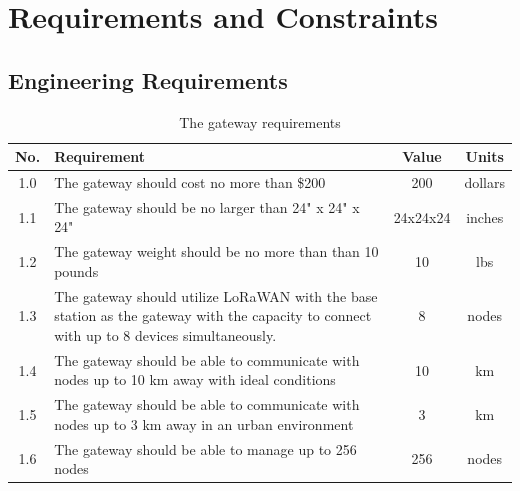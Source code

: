 \documentclass[titlepage, 11pt, letterpaper]{article}
\begin{document}
\section{Requirements and Constraints}
\subsection{Engineering Requirements}

\begin{table}[H]
\centering
\caption{The gateway requirements}
\begin{tabularx}{\linewidth}{|c|X|c|c|}
\hline
No. & Requirement & Value & Units \\
\hline\hline
1.0 & The gateway should cost no more than \$200 & 200 & dollars \\\hline
1.1 & The gateway should be no larger than 24" x 24" x 24" & 24x24x24 & inches \\\hline
1.2 & The gateway weight should be no more than than 10 pounds & 10 & lbs \\\hline
1.3 & The gateway should utilize LoRaWAN with the base station as the gateway with the capacity to connect with up to 8 devices simultaneously. & 8 & nodes \\\hline
1.4 & The gateway should be able to communicate with nodes up to 10 km away with ideal conditions & 10	& km \\\hline
1.5 & The gateway should be able to communicate with nodes up to 3 km away in an urban environment & 3 & km \\\hline
1.6 & The gateway should be able to manage up to 256 nodes & 256 & nodes \\\hline
\end{tabularx}
\label{tab:networkingRequirements}
\end{table}
\end{document}
